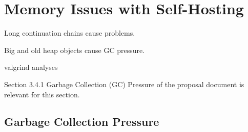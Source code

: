 	\section{Memory Issues with Self-Hosting}
		\begin{mainpoint}
			Long continuation chains cause problems.

			Big and old heap objects cause GC pressure.
		\end{mainpoint}

		valgrind analyses

		\begin{todo}[Import]
			Section 3.4.1 Garbage Collection (GC) Pressure of the proposal document is relevant for this section.
		\end{todo}

		\subsection{Garbage Collection Pressure}
